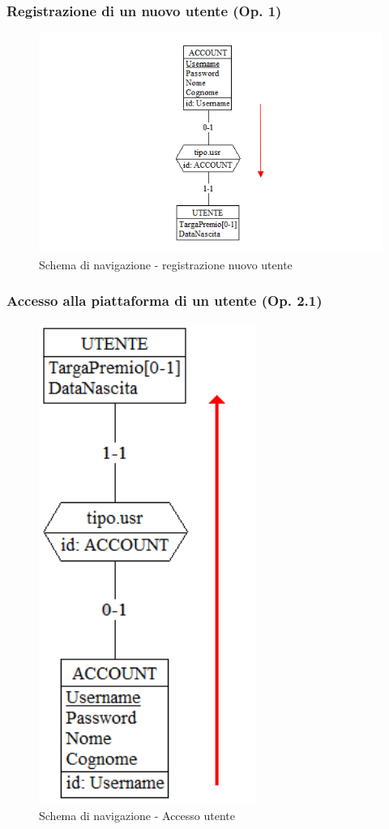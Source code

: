 \documentclass[a4paper,12pt]{report}
\begin{document}
	\subsubsection{Registrazione di un nuovo utente (Op. 1)}
	\begin{figure}[H]
		\centering
		\includegraphics[width=450pt]{ER/navigazione/registrazioneutente.png}
		\caption{Schema di navigazione - registrazione nuovo utente}
	\end{figure}
	
	\subsubsection{Accesso alla piattaforma di un utente (Op. 2.1)}
	\begin{figure}[H]
		\centering
		\includegraphics[width=200pt]{ER/navigazione/accessoutente.png}
		\caption{Schema di navigazione - Accesso utente}
	\end{figure}
	
\end{document}
